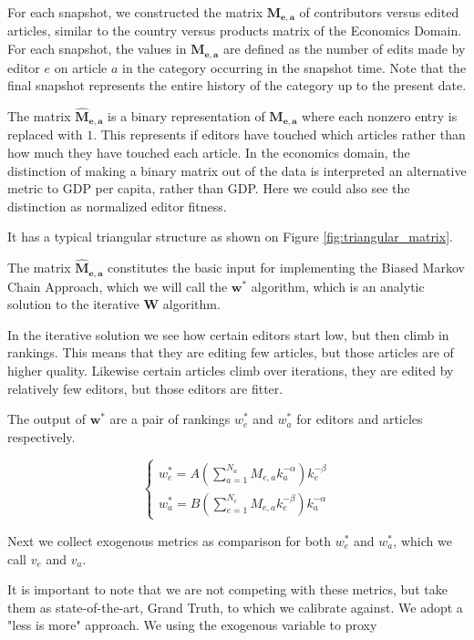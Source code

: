 \documentclass{acm_proc_article-sp}
\begin{document}
 For each snapshot, we constructed the matrix $\mathbf{M_{e,a}}$ of contributors versus edited articles, similar to the country versus products matrix of the Economics Domain. For each snapshot, the values in $\mathbf{M_{e,a}}$ are defined as the number of edits made by editor $e$ on article $a$ in the category occurring in the snapshot time. Note that the final snapshot represents the entire history of the category up to the present date.


 

The matrix $\mathbf{\hat{M}_{e,a}}$ is a binary representation of $\mathbf{M_{e,a}}$ where each nonzero entry is replaced with $1$. This represents if editors have touched which articles rather than how much they have touched each article. In the economics domain, the distinction of making a binary matrix out of the data is interpreted an alternative metric to GDP per capita, rather than GDP. Here we could also see the distinction as normalized editor fitness.

It has a typical triangular structure as shown on Figure \ref{fig:triangular_matrix}.

The matrix $\mathbf{\hat{M}_{e,a}}$ constitutes the basic input for implementing the Biased Markov Chain Approach, which we will call the $\mathbf{w^*}$ algorithm, which is an analytic solution to the iterative $\mathbf{W}$ algorithm. \cite{Caldarelli} 

In the iterative solution we see how certain editors start low, but then climb in rankings. This means that they are editing few articles, but those articles are of higher quality. Likewise certain articles climb over iterations, they are edited by relatively few editors, but those editors are fitter.

The output of $\mathbf{w^*}$ are a pair of rankings $ w^*_e$ and $ w^*_a$ for editors and articles respectively.

\begin{equation}
\begin{cases}
w^*_e = A(\sum^{N_a}_{a=1} M_{e,a}k_a^{-\alpha})k_e^{-\beta} \\
w^*_a = B(\sum^{N_e}_{e=1} M_{e,a}k_e^{-\beta})k_a^{-\alpha}
\end{cases}
\end{equation}

Next we collect exogenous metrics as comparison for both  $w^{*}_{e}$ and $w^{*}_{a}$, which we call  $v_e$ and $v_a$.

It is important to note that we are not competing with these metrics, but take them as state-of-the-art, Grand Truth, to which we calibrate against. We adopt a "less is more" approach. We using the exogenous variable to proxy 
\end{document}
